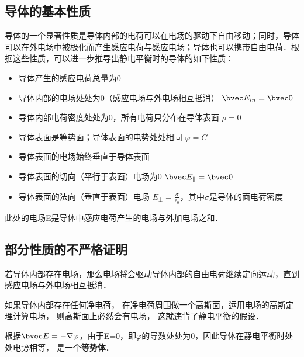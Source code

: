
\begin{issues}
\end{issues}


\subsection{导体的基本性质}
导体的一个显著性质是导体内部的电荷可以在电场的驱动下自由移动；同时，导体可以在外电场中被极化而产生感应电荷与感应电场；导体也可以携带自由电荷．根据这些性质，可以进一步推导出静电平衡时的导体的如下性质\cite{GriffE}：

\begin{itemize}
\item 导体产生的感应电荷总量为0 
\item 导体内部的电场处处为0（感应电场与外电场相互抵消） $\bvec E_{in} = \bvec 0$
\item 导体内部电荷密度处处为0，所有电荷只分布在导体表面 $\rho=0$
\item 导体表面是等势面；导体表面的电势处处相同 $\varphi=C$
\item 导体表面的电场始终垂直于导体表面
\item 导体表面的切向（平行于表面）电场为0 $\bvec E_\parallel = \bvec 0$
\item 导体表面的法向（垂直于表面）电场 $E_\perp = \frac{\sigma}{\epsilon_0}$，其中$\sigma$是导体的面电荷密度
\end{itemize}

此处的电场E是导体中感应电荷产生的电场与外加电场之和．

\subsection{部分性质的不严格证明}
若导体内部存在电场，那么电场将会驱动导体内部的自由电荷继续定向运动，直到感应电场与外电场相互抵消．

如果导体内部存在任何净电荷， 在净电荷周围做一个高斯面，运用电场的高斯定理计算电场， 则高斯面上必然会有电场， 这就违背了静电平衡的假设．

根据$\bvec E=-\nabla\varphi$，由于E=0，即$\varphi$的导数处处为0，因此导体在静电平衡时处处电势相等， 是一个\textbf{等势体}．
\cite{GriffE}


